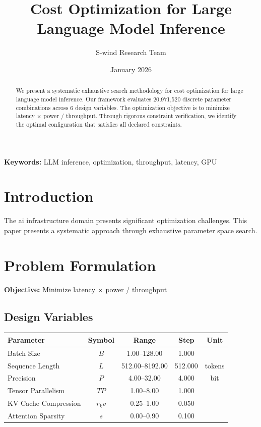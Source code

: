 \documentclass[11pt,a4paper]{article}
\title{Cost Optimization for Large Language Model Inference}
\author{S-wind Research Team}
\date{January 2026}
\begin{document}
\maketitle

\begin{abstract}
We present a systematic exhaustive search methodology for cost optimization for large language model inference. Our framework evaluates 20,971,520 discrete parameter combinations across 6 design variables. The optimization objective is to minimize latency × power / throughput. Through rigorous constraint verification, we identify the optimal configuration that satisfies all declared constraints.
\end{abstract}

\textbf{Keywords:} LLM inference, optimization, throughput, latency, GPU

\section{Introduction}

The ai infrastructure domain presents significant optimization challenges. This paper presents a systematic approach through exhaustive parameter space search.

\section{Problem Formulation}

\textbf{Objective:} Minimize latency × power / throughput

\subsection{Design Variables}

\begin{center}
\begin{tabular}{|l|c|c|c|c|}
\hline
Parameter & Symbol & Range & Step & Unit \\
\hline
Batch Size & $B$ & 1.00--128.00 & 1.000 &  \\
Sequence Length & $L$ & 512.00--8192.00 & 512.000 & tokens \\
Precision & $P$ & 4.00--32.00 & 4.000 & bit \\
Tensor Parallelism & $TP$ & 1.00--8.00 & 1.000 &  \\
KV Cache Compression & $r_kv$ & 0.25--1.00 & 0.050 &  \\
Attention Sparsity & $s$ & 0.00--0.90 & 0.100 &  \\
\hline
\end{tabular}
\end{center}
\end{document}
